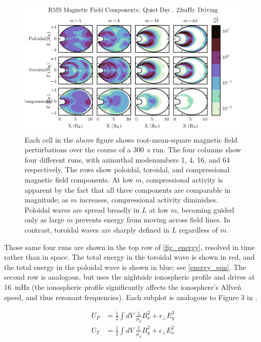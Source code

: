 \documentclass[draft,linenumbers]{agujournal}
\begin{document}
\begin{figure}
    \begin{center}
    \includegraphics[width=\textwidth]{figures/fig_brms.pdf}
    \caption{
        Each cell in the above figure shows root-mean-square magnetic field perturbations over the course of a \SI{300}{\s} run. The four columns show four different runs, with azimuthal modenumbers 1, 4, 16, and 64 respectively. The rows show poloidal, toroidal, and compressional magnetic field components. At low $m$, compressional activity is apparent by the fact that all three components are comparable in magnitude; as $m$ increases, compressional activity diminishes. Poloidal waves are spread broadly in $L$ at low $m$, becoming guided only as large $m$ prevents energy from moving across field lines. In contrast, toroidal waves are sharply defined in $L$ regardless of $m$.
    }
    \label{fig_brms}
    \end{center}
\end{figure}

Those same four runs are shown in the top row of \cref{fig_energy}, resolved in time rather than in space. The total energy in the toroidal wave is shown in red, and the total energy in the poloidal wave is shown in blue; see \cref{energy_eqn}. The second row is analogous, but uses the nightside ionospheric profile and drives at \SI{16}{\mHz} (the ionospheric profile significantly affects the ionosphere's Alfve\'n speed, and thus resonant frequencies). Each subplot is analogous to Figure 3 in \citet{mann_1995}.
\begin{linenomath*}
\begin{align}
  \label{energy_eqn}
    U_P &= \frac{1}{2} \displaystyle\int dV \; \frac{1}{\mu_0} B_x^2 + \epsilon_\bot E_y^2 \\
    U_T &= \frac{1}{2} \displaystyle\int dV \; \frac{1}{\mu_0} B_y^2 + \epsilon_\bot E_x^2
\end{align}
\end{linenomath*}
\end{document}
